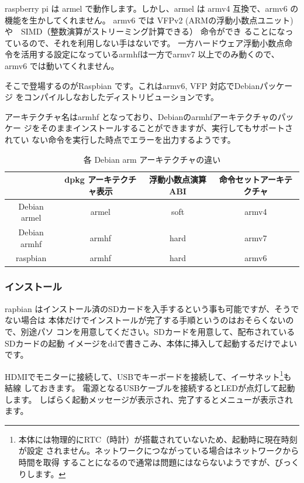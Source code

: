 \documentclass[mingoth,a4paper]{jsarticle}
\begin{document}
raspberry pi は armel で動作します。しかし、armel は armv4 互換で、armv6 の機能を生かしてくれません。
armv6 では VFPv2 (ARMの浮動小数点ユニット) や　SIMD（整数演算がストリーミング計算できる） 命令ができ
ることになっているので、それを利用しない手はないです。
一方ハードウェア浮動小数点命令を活用する設定になっているarmhfは一方でarmv7 以上でのみ動くので、armv6 では動いてくれません。

そこで登場するのがRaspbian です。これはarmv6, VFP 対応でDebianパッケージ
をコンパイルしなおしたディストリビューションです。

アーキテクチャ名はarmhf となっており、Debianのarmhfアーキテクチャのパッケー
ジをそのままインストールすることができますが、実行してもサポートされてい
ない命令を実行した時点でエラーを出力するようです。

\begin{table}[ht]
\begin{center}
\caption{各 Debian arm アーキテクチャの違い}
  \begin{tabular}{|c|c|c|c|}
 \hline
 & dpkg アーキテクチャ表示 & 浮動小数点演算ABI & 命令セットアーキテクチャ\\
 \hline
   Debian armel & armel & soft & armv4 \\
   Debian armhf & armhf & hard & armv7 \\
   raspbian & armhf & hard & armv6 \\
 \hline
 \end{tabular}
\end{center}
\end{table}

\subsubsection{インストール}

rapbian はインストール済のSDカードを入手するという事も可能ですが、そうでない場合は
本体だけでインストールが完了する手順というのはおそらくないので、別途パソ
コンを用意してください。SDカードを用意して、配布されているSDカードの起動
イメージをddで書きこみ、本体に挿入して起動するだけでよいです。
\cite{raspberrypidownloads, raspbian}

HDMIでモニターに接続して、USBでキーボードを接続して、イーサネット\footnote{
本体には物理的にRTC（時計）が搭載されていないため、起動時に現在時刻が設定
されません。ネットワークにつながっている場合はネットワークから時間を取得
することになるので通常は問題にはならないようですが、びっくりします。
}も結線
しておきます。
電源となるUSBケーブルを接続するとLEDが点灯して起動します。
しばらく起動メッセージが表示され、完了するとメニューが表示されます。
\end{document}
